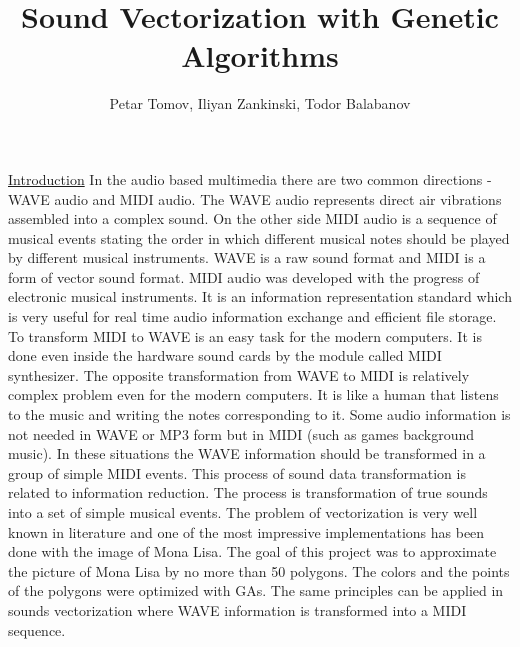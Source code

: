 \documentclass{article}
\title{Sound Vectorization with Genetic Algorithms}
\author{Petar Tomov, Iliyan Zankinski, Todor Balabanov}
\begin{document}
%
\maketitle

\underline{Introduction} In the audio based multimedia there are two common directions - WAVE audio and MIDI audio. The WAVE audio represents direct air vibrations assembled into a complex sound. On the other side MIDI audio is a sequence of musical events stating the order in which different musical notes should be played by different musical instruments. WAVE is a raw sound format and MIDI is a form of vector sound format. MIDI audio was developed with the progress of electronic musical instruments. It is an information representation standard which is very useful for real time audio information exchange and efficient file storage. To transform MIDI to WAVE is an easy task for the modern computers. It is done even inside the hardware sound cards by the module called MIDI synthesizer. The opposite transformation from WAVE to MIDI is relatively complex problem even for the modern computers. It is like a human that listens to the music and writing the notes corresponding to it. Some audio information is not needed in WAVE or MP3 form but in MIDI (such as games background music). In these situations the WAVE information should be transformed in a group of simple MIDI events. This process of sound data transformation is related to information reduction. The process is transformation of true sounds into a set of simple musical events. The problem of vectorization is very well known in literature and one of the most impressive implementations has been done with the image of Mona Lisa. The goal of this project was to approximate the picture of Mona Lisa by no more than 50 polygons. The colors and the points of the polygons were optimized with GAs. The same principles can be applied in sounds vectorization where WAVE information is transformed into a MIDI sequence.
\vspace*{3mm}
\end{document}
